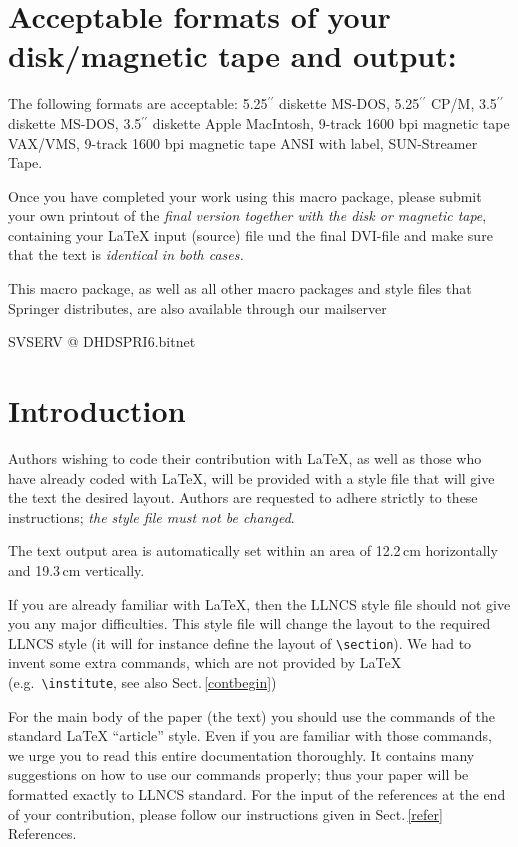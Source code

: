 \section*{Acceptable formats of your disk/magnetic tape and output:}
%
The following formats are acceptable: 5.25$^{\prime\prime}$ diskette
MS-DOS, 5.25$^{\prime\prime}$ CP/M, 3.5$^{\prime\prime}$ diskette
MS-DOS, 3.5$^{\prime\prime}$ diskette Apple MacIntosh, 9-track 1600
bpi magnetic tape VAX/VMS, 9-track 1600 bpi magnetic tape ANSI with
label, SUN-Streamer Tape.

Once you have completed your work using this macro package,
please submit your own printout of the {\it final
version together with the disk or magnetic tape}, containing your
\LaTeX{} input (source) file und the final DVI-file and make sure
that the text is {\it identical in both cases.}

\bigskip
This macro package, as well as all other macro packages and style
files that Springer distributes, are also available through our
mailserver

SVSERV @ DHDSPRI6.bitnet
%
\newpage
\tableofcontents
\newpage
%
\section{Introduction}
%
Authors wishing to code their contribution
with \LaTeX{}, as well as those who have already coded with \LaTeX{},
will be provided with a style file that will give the text the
desired layout. Authors are requested to
adhere strictly to these instructions; {\it the style
file must not be changed}.

The text output area is automatically set within an area of
12.2\,cm horizontally  and 19.3\,cm vertically.

If you are already familiar with \LaTeX{}, then the
LLNCS style file should not give you any major difficulties.
This style file will change the layout to the required LLNCS style
(it will for instance  define the layout of \verb|\section|).
We had to invent some extra commands,
which are not provided by \LaTeX{} (e.g.\
\verb|\institute|, see also Sect.\,\ref{contbegin})

For the main body of the paper (the text) you
should use the commands of the standard \LaTeX{} ``article'' style.
Even if you are familiar with those commands, we urge you to read
this entire documentation thoroughly. It contains many suggestions on
how to use our commands properly; thus  your paper
will be formatted exactly to LLNCS standard.
For the input of the references at the end of your contribution,
please follow our instructions given in Sect.\,\ref{refer} References.

